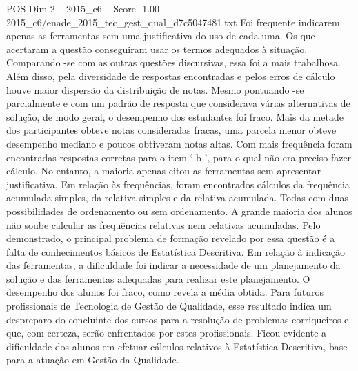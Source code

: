 \begin{textsample}{POS Dim 2 – 2015\_c6 – Score -1.00 – 2015\_c6/enade\_2015\_tec\_gest\_qual\_d7c5047481.txt}
Foi frequente indicarem apenas as ferramentas sem uma justificativa do uso de cada uma.
Os que acertaram a questão conseguiram usar os termos adequados à situação.
Comparando -se com as outras questões discursivas, essa foi a mais trabalhosa.
Além disso, pela diversidade de respostas encontradas e pelos erros de cálculo houve maior dispersão da distribuição de notas.
Mesmo pontuando -se parcialmente e com um padrão de resposta que considerava várias alternativas de solução, de modo geral, o desempenho dos estudantes foi fraco.
Mais da metade dos participantes obteve notas consideradas fracas, uma parcela menor obteve desempenho mediano e poucos obtiveram notas altas.
Com mais frequência foram encontradas respostas corretas para o item ‘ b ’, para o qual não era preciso fazer cálculo.
No entanto, a maioria apenas citou as ferramentas sem apresentar justificativa.
Em relação às frequências, foram encontrados cálculos da frequência acumulada simples, da relativa simples e da relativa acumulada.
Todas com duas possibilidades de ordenamento ou sem ordenamento.
A grande maioria dos alunos não soube calcular as frequências relativas nem relativas acumuladas.
Pelo demonstrado, o principal problema de formação revelado por essa questão é a falta de conhecimentos básicos de Estatística Descritiva.
Em relação à indicação das ferramentas, a dificuldade foi indicar a necessidade de um planejamento da solução e das ferramentas adequadas para realizar este planejamento.
O desempenho dos alunos foi fraco, como revela a média obtida.
Para futuros profissionais de Tecnologia de Gestão de Qualidade, esse resultado indica um despreparo do concluinte dos cursos para a resolução de problemas corriqueiros e que, com certeza, serão enfrentados por estes profissionais.
Ficou evidente a dificuldade dos alunos em efetuar cálculos relativos à Estatística Descritiva, base para a atuação em Gestão da Qualidade.

\end{textsample}
